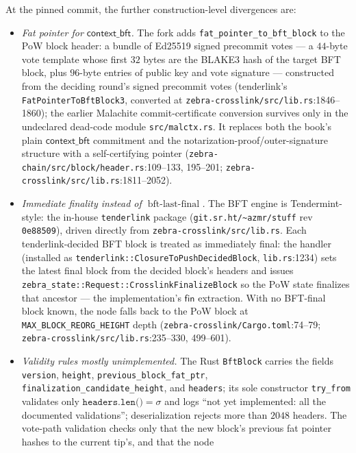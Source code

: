 \documentclass[11pt,a4paper]{article}
\theoremstyle{definition}
\begin{document}
At the pinned commit, the further construction-level divergences are:
\begin{itemize}
\item \emph{Fat pointer for $\mathsf{context\_bft}$.} The fork adds
  \texttt{fat\_pointer\_to\_bft\_block} to the PoW block header: a bundle
  of Ed25519 signed precommit votes --- a $44$-byte vote template whose
  first $32$ bytes are the BLAKE3 hash of the target BFT block, plus
  $96$-byte entries of public key and vote signature --- constructed from
  the deciding round's signed precommit votes (tenderlink's
  \texttt{FatPointerToBftBlock3}, converted at
  \texttt{zebra-crosslink/src/lib.rs}:1846--1860); the earlier Malachite
  commit-certificate conversion survives only in the undeclared
  dead-code module \texttt{src/malctx.rs}. It replaces both the book's
  plain $\mathsf{context\_bft}$ commitment and the
  notarization-proof/outer-signature structure with a self-certifying
  pointer (\texttt{zebra-chain/src/block/header.rs}:109--133, 195--201;
  \texttt{zebra-crosslink/src/lib.rs}:1811--2052).
\item \emph{Immediate finality instead of
  $\operatorname{bft\text{-}last\text{-}final}$.} The BFT engine is
  Tendermint-style: the in-house \texttt{tenderlink} package
  (\texttt{git.sr.ht/\textasciitilde azmr/stuff} rev \texttt{0e88509}),
  driven directly from \texttt{zebra-crosslink/src/lib.rs}. Each
  tenderlink-decided BFT block is treated as immediately final: the
  handler (installed as \texttt{tenderlink::ClosureToPushDecidedBlock},
  \texttt{lib.rs}:1234) sets the latest final block from the
  decided block's headers and issues
  \texttt{zebra\_state::Request::CrosslinkFinalizeBlock} so the PoW state
  finalizes that ancestor --- the implementation's $\mathsf{fin}$
  extraction. With no BFT-final block known, the node falls back to the
  PoW block at \texttt{MAX\_BLOCK\_REORG\_HEIGHT} depth
  (\texttt{zebra-crosslink/Cargo.toml}:74--79;
  \texttt{zebra-crosslink/src/lib.rs}:235--330, 499--601).
\item \emph{Validity rules mostly unimplemented.} The Rust
  \texttt{BftBlock} carries the fields \texttt{version},
  \texttt{height}, \texttt{previous\_block\_fat\_ptr},
  \texttt{finalization\_candidate\_height}, and \texttt{headers}; its
  sole constructor \texttt{try\_from} validates only
  $\texttt{headers.len()} = \sigma$ and logs ``not yet implemented: all
  the documented validations''; deserialization rejects more than $2048$
  headers. The vote-path validation checks only that the new block's
  previous fat pointer hashes to the current tip's, and that the node

\end{itemize}
\end{document}
